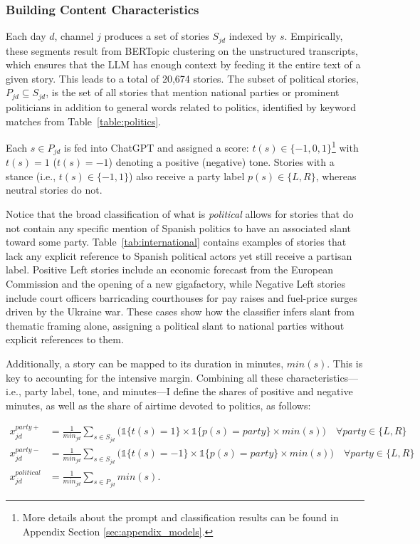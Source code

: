 \documentclass[12pt]{article}
\begin{document}
	
	\subsubsection*{Building Content Characteristics}
	
	Each day \(d\), channel \(j\) produces a set of stories \(S_{jd}\) indexed by \(s\). Empirically, these segments result from BERTopic clustering on the unstructured transcripts, which ensures that the LLM has enough context by feeding it the entire text of a given story. This leads to a total of 20,674 stories. The subset of political stories, \({P}_{jd}\subseteq S_{jd}\), is the set of all stories that mention national parties or prominent politicians in addition to general words related to politics, identified by keyword matches from Table~\ref{table:politics}.
	
	Each \(s\in {P}_{jd}\) is fed into ChatGPT and  assigned a score: \({t}(s)\in\{-1,0,1\}\)\footnote{More details about the prompt and classification results can be found in Appendix Section \ref{sec:appendix_models}.} with ${t}(s)=1$ (${t}(s)=-1$) denoting a positive (negative) tone. Stories with a stance (i.e., \({t}(s)\in\{-1,1\}\)) also receive a party label \({p}(s)\in\{L,R\}\), whereas neutral stories do not. 
	
	Notice that the broad classification of what is \emph{political} allows for stories that do not contain any specific mention of Spanish politics to have an associated slant toward some party.	Table~\ref{tab:international} contains examples of stories that lack any explicit reference to Spanish political actors yet still receive a partisan label. Positive Left stories include an economic forecast from the European Commission and the opening of a new gigafactory, while Negative Left stories include court officers barricading courthouses for pay raises and fuel-price surges driven by the Ukraine war. These cases show how the classifier infers slant from thematic framing alone, assigning a political slant to national parties without explicit references to them. 
	
	
	Additionally, a story can be mapped to its duration in minutes, \( {min}(s)\). This is key to accounting for the intensive margin. Combining all these characteristics—i.e., party label, tone, and minutes—I define the shares of positive and negative minutes, as well as the share of airtime devoted to politics, as follows:
	
	
	


		\begin{equation}\label{eq:controls}
		\begin{aligned}
			x_{jd}^{party+}&= \frac{1}{min_{jd}} \sum_{s \in S_{jd}}\bigg(\mathds{1}\{t(s)=1\} \times \mathds{1}\{p(s)=party\}\times min(s) \bigg) \quad \forall party \in \{L,R\} \\
			x_{jd}^{party-}&= \frac{1}{min_{jd}} \sum_{s \in S_{jd}}\bigg( \mathds{1}\{t(s)=-1\} \times \mathds{1}\{p(s)=party\} \times min(s)\bigg) \quad \forall party \in \{L,R\} \\
			x_{jd}^{political}&=\frac{1}{min_{jd}} \sum_{s \in P_{jd}}min(s).
		\end{aligned}
	\end{equation} 
	
\end{document}
